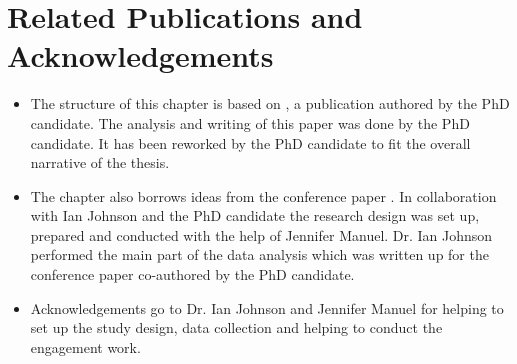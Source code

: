 \section*{Related Publications and Acknowledgements}
\begin{itemize}
\item The structure of this chapter is based on \citet{puussaar_making_2018}, a publication authored by the PhD candidate. The analysis and writing of this paper was done by the PhD candidate. It has been reworked by the PhD candidate to fit the overall narrative of the thesis.
\item The chapter also borrows ideas from the conference paper \citet{johnson_neighbourhood_2018}. In collaboration with Ian Johnson and the PhD candidate the research design was set up, prepared and conducted with the help of Jennifer Manuel. Dr. Ian Johnson performed the main part of the data analysis which was written up for the conference paper co-authored by the PhD candidate.
\item Acknowledgements go to Dr. Ian Johnson and Jennifer Manuel for helping to set up the study design, data collection and helping to conduct the engagement work.
\end{itemize}
\clearpage

